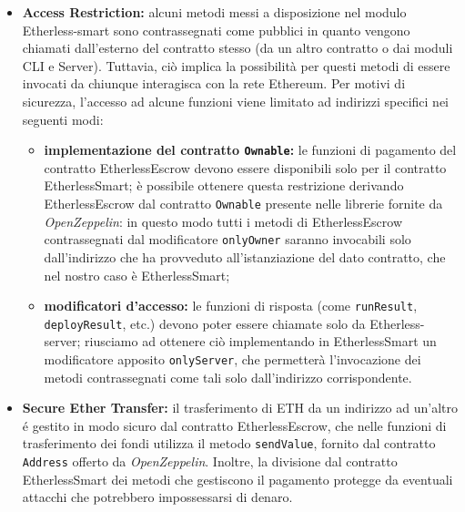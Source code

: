   \begin{itemize}
    
    \item \textbf{Access Restriction:} alcuni metodi messi a disposizione nel modulo Etherless-smart sono contrassegnati come pubblici in quanto vengono chiamati dall'esterno del contratto stesso (da un altro contratto o dai moduli CLI e Server). Tuttavia, ciò implica la possibilità per questi metodi di essere invocati da chiunque interagisca con la rete Ethereum. Per motivi di sicurezza, l'accesso ad alcune funzioni viene limitato ad indirizzi specifici nei seguenti modi:
      \begin{itemize}
        \item \textbf{implementazione del contratto \texttt{Ownable}:} le funzioni di pagamento del contratto EtherlessEscrow devono essere disponibili solo per il contratto EtherlessSmart; è possibile ottenere questa restrizione derivando EtherlessEscrow dal contratto \texttt{Ownable} presente nelle librerie fornite da \textit{OpenZeppelin}: in questo modo tutti i metodi di EtherlessEscrow contrassegnati dal modificatore \texttt{onlyOwner} saranno invocabili solo dall'indirizzo che ha provveduto all'istanziazione del dato contratto, che nel nostro caso è EtherlessSmart;
        \item \textbf{modificatori d'accesso:} le funzioni di risposta (come \texttt{runResult}, \texttt{deployResult}, etc.) devono poter essere chiamate solo da Etherless-server; riusciamo ad ottenere ciò implementando in EtherlessSmart un modificatore apposito \texttt{onlyServer}, che permetterà l'invocazione dei metodi contrassegnati come tali solo dall'indirizzo corrispondente.
      \end{itemize}
      
    \item \textbf{Secure Ether Transfer:} il trasferimento di ETH da un indirizzo ad un'altro é gestito in modo sicuro dal contratto EtherlessEscrow, che nelle funzioni di trasferimento dei fondi utilizza il metodo \texttt{sendValue}, fornito dal contratto \texttt{Address} offerto da \textit{OpenZeppelin}. Inoltre, la divisione dal contratto EtherlessSmart dei metodi che gestiscono il pagamento protegge da eventuali attacchi che potrebbero impossessarsi di denaro.


\end{itemize}
